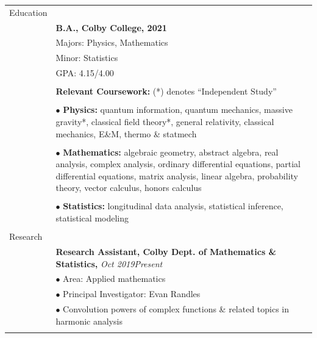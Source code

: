 \documentclass[10pt]{article}
\begin{document}
\noindent \begin{longtable}{ l m{13.5cm}   }

	
  \large{Education}    	& \\ 
  						& \textbf{B.A., Colby College, 2021} \\
     				 	& Majors: Physics, Mathematics \\
     				 	& Minor: Statistics  \\
     					& GPA: 4.15/4.00 \\
	 					& \\
	 					& \textbf{Relevant Coursework:} (*) denotes ``Independent Study'' \\ \vspace{-12pt}
	 					& \\
	 					& $\bullet$ \textbf{Physics:} quantum information, quantum mechanics, massive gravity*, classical field theory*,  general relativity, classical mechanics, E\&M, thermo \& statmech\\  \vspace{-9pt}
	 					& \\
	 					& $\bullet$ \textbf{Mathematics:} algebraic geometry, abstract algebra, real analysis, complex analysis, ordinary differential equations, partial differential equations, matrix analysis, linear algebra, probability theory, vector calculus, honors calculus\\   \vspace{-9pt}
	 					& \\ 
	 					& $\bullet$ \textbf{Statistics:} longitudinal data analysis, statistical inference,  statistical modeling\\
	 					& \\
    
        
  \large{Research}      & \\  
  						& \textbf{Research Assistant, Colby Dept. of Mathematics \& Statistics,} \textit{Oct 2019\textendash Present }\\
  						& $\bullet$ Area: Applied mathematics \\
  						& $\bullet$ Principal Investigator: Evan Randles  \\ %
  						& $\bullet$  Convolution powers of complex functions \& related topics in harmonic analysis \\
  						& \\
  						

\end{longtable}
\end{document}
